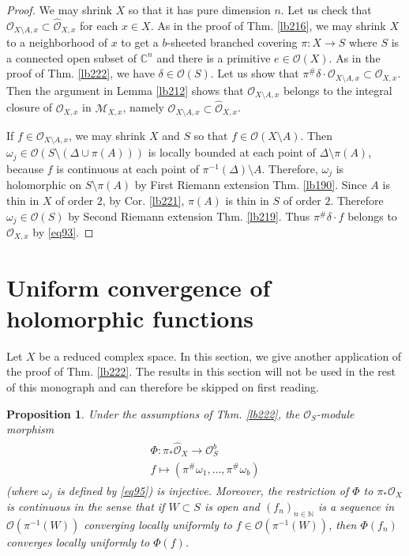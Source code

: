 \documentclass[12pt,b5paper,notitlepage]{report}
\theoremstyle{definition}
\theoremstyle{plain}
\newtheorem{pp}[df]{Proposition}
\newcommand{\wht}{\widehat}
\newcommand{\scr}{\mathscr}
\newcommand{\Cbb}{\mathbb C}
\newcommand{\Nbb}{\mathbb N}
\newcommand{\Owht}{\widehat{\scr O}}
\numberwithin{equation}{section}
\begin{document}
\begin{proof}
We may shrink $X$ so that it has pure dimension $n$. Let us check that $\scr O_{X\setminus A,x}\subset\Owht_{X,x}$ for each $x\in X$. As in the proof of Thm. \ref{lb216}, we may shrink $X$ to a neighborhood of $x$ to get a $b$-sheeted branched covering $\pi:X\rightarrow S$ where $S$ is a connected open subset of $\Cbb^n$ and there is a primitive $e\in\scr O(X)$. As in the proof of Thm. \ref{lb222}, we have $\delta\in\scr O(S)$. Let us show that $\pi^\#\delta\cdot\scr O_{X\setminus A,x}\subset\scr O_{X,x}$. Then the argument in Lemma \ref{lb212} shows that $\scr O_{X\setminus A,x}$ belongs to the integral closure of $\scr O_{X,x}$ in $\scr M_{X,x}$, namely $\scr O_{X\setminus A,x}\subset\Owht_{X,x}$.

If $f\in\scr O_{X\setminus A,x}$, we may shrink $X$ and $S$ so that $f\in\scr O(X\setminus A)$. Then $\omega_j\in\scr O(S\setminus(\Delta\cup\pi(A)))$ is locally bounded at each point of $\Delta\setminus\pi(A)$, because $f$ is continuous at each point of $\pi^{-1}(\Delta)\setminus A$. Therefore, $\omega_j$ is holomorphic on $S\setminus \pi(A)$ by First Riemann extension Thm. \ref{lb190}. Since $A$ is thin in $X$ of order $2$, by Cor. \ref{lb221}, $\pi(A)$ is thin in $S$ of order $2$. Therefore $\omega_j\in\scr O(S)$ by Second Riemann extension Thm. \ref{lb219}. Thus $\pi^\#\delta\cdot f$ belongs to $\scr O_{X,x}$ by \eqref{eq93}.
\end{proof}




\section{Uniform convergence of holomorphic functions}

Let $X$ be a reduced complex space. In this section, we give another application of the proof of Thm. \ref{lb222}. The results in this section will not be used in the rest of this monograph and can therefore be skipped on first reading.


\begin{pp}\label{lb365}
Under the assumptions of Thm. \ref{lb222}, the $\scr O_S$-module morphism
\begin{gather}
\begin{gathered}
\Phi:\pi_*\wht{\scr O}_X\rightarrow \scr O_S^b\\
f\mapsto (\pi^\#\omega_1,\dots,\pi^\#\omega_b)
\end{gathered}
\end{gather}
(where $\omega_j$ is defined by \eqref{eq95}) is injective. Moreover, the restriction of $\Phi$ to $\pi_*\scr O_X$ is continuous in the sense that if $W\subset S$ is open and $(f_n)_{n\in\Nbb}$ is a sequence in $\scr O(\pi^{-1}(W))$ converging locally uniformly to $f\in \scr O(\pi^{-1}(W))$, then $\Phi(f_n)$ converges locally uniformly to $\Phi(f)$.
\end{pp}
\end{document}
